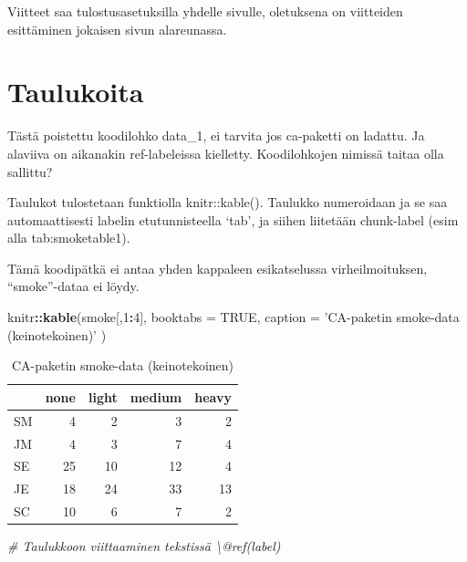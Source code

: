\documentclass[
  finnish,
]{book}
\newenvironment{Shaded}{\begin{snugshade}}{\end{snugshade}}
\newcommand{\CommentTok}[1]{\textcolor[rgb]{0.56,0.35,0.01}{\textit{#1}}}
\newcommand{\DataTypeTok}[1]{\textcolor[rgb]{0.13,0.29,0.53}{#1}}
\newcommand{\DecValTok}[1]{\textcolor[rgb]{0.00,0.00,0.81}{#1}}
\newcommand{\KeywordTok}[1]{\textcolor[rgb]{0.13,0.29,0.53}{\textbf{#1}}}
\newcommand{\NormalTok}[1]{#1}
\newcommand{\OperatorTok}[1]{\textcolor[rgb]{0.81,0.36,0.00}{\textbf{#1}}}
\newcommand{\OtherTok}[1]{\textcolor[rgb]{0.56,0.35,0.01}{#1}}
\newcommand{\StringTok}[1]{\textcolor[rgb]{0.31,0.60,0.02}{#1}}
\begin{document}
Viitteet saa tulostusasetuksilla yhdelle sivulle, oletuksena on viitteiden esittäminen jokaisen sivun alareunassa.

\hypertarget{taulukoita}{%
\section{Taulukoita}\label{taulukoita}}

Tästä poistettu koodilohko data\_1, ei tarvita jos ca-paketti on ladattu. Ja alaviiva on aikanakin ref-labeleissa kielletty. Koodilohkojen nimissä taitaa olla sallittu?

Taulukot tulostetaan funktiolla knitr::kable(). Taulukko numeroidaan ja se saa automaattisesti labelin etutunnisteella `tab', ja siihen liitetään chunk-label (esim alla tab:smoketable1).

Tämä koodipätkä ei antaa yhden kappaleen esikatselussa virheilmoituksen, ``smoke''-dataa ei löydy.

\begin{Shaded}
\begin{Highlighting}[]
\NormalTok{knitr}\OperatorTok{::}\KeywordTok{kable}\NormalTok{(smoke[,}\DecValTok{1}\OperatorTok{:}\DecValTok{4}\NormalTok{], }\DataTypeTok{booktabs =} \OtherTok{TRUE}\NormalTok{,}
  \DataTypeTok{caption =} \StringTok{'CA-paketin smoke-data (keinotekoinen)'}
\NormalTok{)}
\end{Highlighting}
\end{Shaded}

\begin{table}

\caption{\label{tab:smoketable1}CA-paketin smoke-data (keinotekoinen)}
\centering
\begin{tabular}[t]{lrrrr}
\toprule
  & none & light & medium & heavy\\
\midrule
SM & 4 & 2 & 3 & 2\\
JM & 4 & 3 & 7 & 4\\
SE & 25 & 10 & 12 & 4\\
JE & 18 & 24 & 33 & 13\\
SC & 10 & 6 & 7 & 2\\
\bottomrule
\end{tabular}
\end{table}

\begin{Shaded}
\begin{Highlighting}[]
\CommentTok{# Taulukkoon viittaaminen tekstissä \textbackslash{}@ref(label)}
\end{Highlighting}
\end{Shaded}
\end{document}
